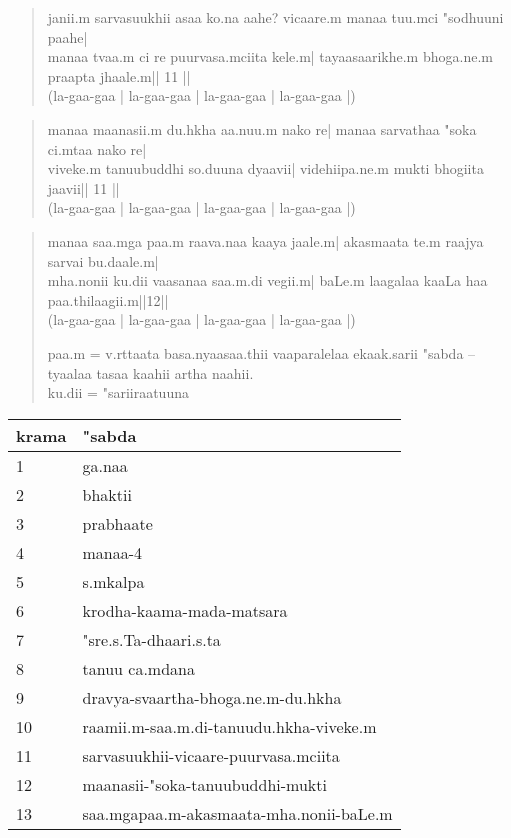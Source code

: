 \documentclass[a6paper]{article}
\begin{document}
    \begin{verse}
        janii.m sarvasuukhii asaa ko.na aahe?
        vicaare.m manaa tuu.mci "sodhuuni paahe|\\

        manaa tvaa.m ci re puurvasa.mciita kele.m|
        tayaasaarikhe.m bhoga.ne.m praapta jhaale.m|| 11 ||\\
        (la-gaa-gaa | la-gaa-gaa | la-gaa-gaa | la-gaa-gaa |)
    \end{verse}
    \begin{verse}
        manaa maanasii.m du.hkha aa.nuu.m nako re|
        manaa sarvathaa "soka ci.mtaa nako re|\\

        viveke.m tanuubuddhi so.duuna dyaavii|
        videhiipa.ne.m mukti bhogiita jaavii|| 11 ||\\
        (la-gaa-gaa | la-gaa-gaa | la-gaa-gaa | la-gaa-gaa |)
    \end{verse}
    \begin{verse}
        manaa saa.mga paa.m raava.naa kaaya jaale.m|
        akasmaata te.m raajya sarvai bu.daale.m|\\

        mha.nonii ku.dii vaasanaa saa.m.di vegii.m|
        baLe.m laagalaa kaaLa haa paa.thilaagii.m||12||\\
        (la-gaa-gaa | la-gaa-gaa | la-gaa-gaa | la-gaa-gaa |)

        paa.m = v.rttaata basa.nyaasaa.thii vaaparalelaa ekaak.sarii "sabda -- tyaalaa tasaa kaahii artha naahii.\\
        ku.dii = "sariiraatuuna
    \end{verse}

\begin{tabular}{|l|l|}
\hline
krama & "sabda\\
\hline
1 & ga.naa \\
\hline
2 & bhaktii \\
\hline
3 & prabhaate \\
\hline
4 & manaa-4 \\
\hline
5 & s.mkalpa \\
\hline
6 & krodha-kaama-mada-matsara \\
\hline
7 & "sre.s.Ta-dhaari.s.ta \\
\hline
8 & tanuu ca.mdana\\
\hline
9 & dravya-svaartha-bhoga.ne.m-du.hkha\\
\hline
10 & raamii.m-saa.m.di-tanuudu.hkha-viveke.m\\
\hline
11 & sarvasuukhii-vicaare-puurvasa.mciita\\
\hline
12 & maanasii-"soka-tanuubuddhi-mukti\\
\hline
13 & saa.mgapaa.m-akasmaata-mha.nonii-baLe.m\\
\hline
\end{tabular}
        
\end{document}
